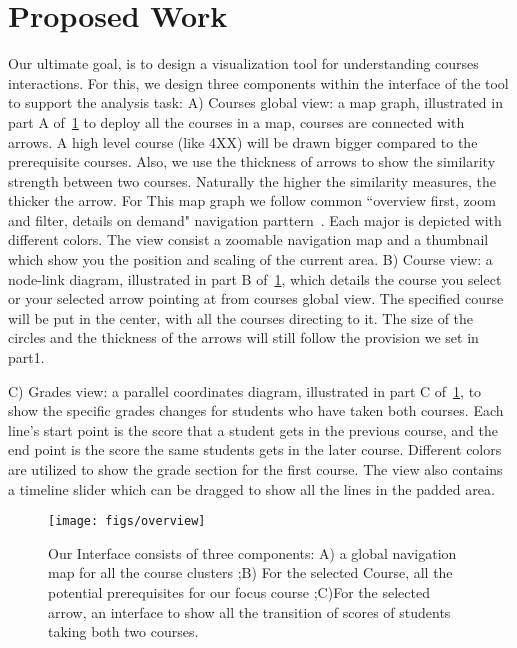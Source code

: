 \section{Proposed Work} %
\label{sec:proposed}

Our ultimate goal, is to design a visualization tool for understanding courses interactions. For this, we design three components within the interface of the tool to support the analysis task:
A) Courses global view: a map graph, illustrated in part A of~\ref{fig:overview} to deploy all the courses in a map, courses are connected with arrows. A high level course (like 4XX) will be drawn bigger compared to the prerequisite courses. Also, we use the thickness of arrows to show the similarity strength between two courses. Naturally the higher the similarity measures, the thicker the arrow. For This map graph we follow common ``overview first, zoom and filter, details on demand" navigation parttern~\cite{Shneiderman:1996:ETD:832277.834354}. Each major is depicted with different colors. The view consist a zoomable navigation map and a thumbnail which show you the position and scaling of the current area.
B) Course view: a node-link diagram, illustrated in part B of~\ref{fig:overview}, which details the course you select or your selected arrow pointing at  from courses global view. The specified course will be put in the center, with all the courses directing to it. The size of the circles and the thickness of the arrows will still follow the provision we set in part1.

C) Grades view: a parallel coordinates diagram, illustrated in part C of~\ref{fig:overview}, to show the specific grades changes for students who have taken both courses. Each line’s start point is the score that a student gets in the previous course, and the end point is the score the same students gets in the later course. Different colors are utilized to show the grade section for the first course. The view also contains a timeline slider which can be dragged to show all the lines in the padded area.

\begin{figure}[h]
 \centering %
 \texttt{[image: figs/overview]}
 \caption{Our Interface consists of three components: A) a global navigation map for all the course clusters ;B) For the selected Course, all the potential prerequisites for our focus course ;C)For the selected arrow, an interface to show all the transition of scores of students taking both two courses.}
 \label{fig:overview}
\end{figure}

